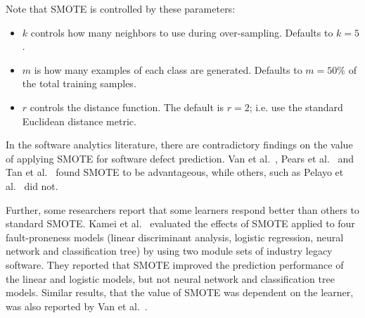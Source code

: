 \documentclass[10pt,conference]{IEEEtran}
\newcommand{\bi}{\begin{itemize}[leftmargin=0.4cm]}
\newcommand{\ei}{\end{itemize}}
\theoremstyle{break}
\theoremstyle{break}
\begin{document}
\noindent
Note that SMOTE is controlled by these  parameters:
\bi
\item $k$ controls how many neighbors to use during over-sampling. Defaults to $k=5$.
\item $m$ is how many examples of each class are generated. Defaults to $m=50\%$ of the total training samples.
\item $r$ controls the distance function. The default is $r=2$;
i.e. use the  
standard Euclidean distance metric.
\ei

 


In the software analytics literature, there are contradictory findings on
the value of applying SMOTE for software defect prediction.
Van et al.~\cite{van2007experimental}, Pears et al.~\cite{pears2014synthetic} and Tan et al.~\cite{tan2015online} found SMOTE to be advantageous, while others, such as Pelayo et al.~\cite{pelayo2007applying} did not. 

Further, some researchers report that some learners respond better than others to standard SMOTE. Kamei et al.~\cite{kamei2007effects} evaluated the effects of SMOTE applied to  four fault-proneness models
(linear discriminant analysis, logistic regression, neural network and classification tree) by
using two module sets of industry legacy software. They reported that SMOTE improved the prediction performance of the linear and logistic models, but not neural network and classification tree models. Similar results, that the value of SMOTE was dependent on the learner,
was also reported by Van et al.~\cite{van2007experimental}.
\end{document}
